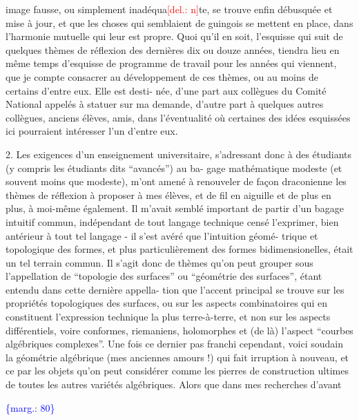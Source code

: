 \documentclass[11pt]{article}
\newcommand{\scanpage}[1]{\par\bigskip\noindent{\small\sffamily[scan #1]}\par}
\newcommand{\mspage}[1]{{\small\sffamily[p.\,#1]}}
\newcommand{\margin}[1]{\textcolor{blue}{\{\textsf{marg.:} #1\}}}
\newcommand{\deleted}[1]{\textcolor{red}{[\textsf{del.:} #1]}}
\begin{document}
image fausse, ou simplement inadéqua\deleted{n}te, se trouve enfin débusquée
et mise à jour, et que les choses qui semblaient de guingois se
mettent en place, dans l'harmonie mutuelle qui leur est propre.
\qquad Quoi qu'il en soit, l'esquisse qui suit de quelques
thèmes de réflexion des dernières dix ou douze années, tiendra
lieu en même temps d'esquisse de programme de travail pour les
années qui viennent, que je compte consacrer au développement de
ces thèmes, ou au moins de certains d'entre eux. Elle est desti-%
née, d'une part aux collègues du Comité National appelés à statuer
sur ma demande, d'autre part à quelques autres collègues, anciens
élèves, amis, dans l'éventualité où certaines des idées esquissées
ici pourraient intéresser l'un d'entre eux.

2. \qquad Les exigences d'un enseignement universitaire, s'adressant
donc à des étudiants (y compris les étudiants dits ``avancés'') au ba-%
gage mathématique modeste (et souvent moins que modeste), m'ont amené
à renouveler de façon draconienne les thèmes de réflexion à proposer
à mes élèves, et de fil en aiguille et de plus en plus, à moi-même
également. Il m'avait semblé important de partir d'un bagage intuitif
commun, indépendant de tout langage technique censé l'exprimer, bien
antérieur à tout tel langage - il s'est avéré que l'intuition géomé-%
trique et topologique des formes, et plus particulièrement des formes
bidimensionelles, était un tel terrain commun. Il s'agit donc de thèmes
qu'on peut grouper sous l'appellation de ``topologie des surfaces'' ou
``géométrie des surfaces'', étant entendu dans cette dernière appella-%
tion que l'accent principal se trouve sur les propriétés topologiques
des surfaces, ou sur les aspects combinatoires qui en constituent
l'expression technique la plus terre-à-terre, et non sur les aspects
différentiels, voire conformes, riemaniens, holomorphes et (de là)
l'aspect ``courbes algébriques complexes''. Une fois ce dernier pas
franchi cependant, voici soudain la géométrie algébrique (mes anciennes
amours !) qui fait irruption à nouveau, et ce par les objets qu'on
peut considérer comme les pierres de construction ultimes de toutes
les autres variétés algébriques. Alors que dans mes recherches d'avant

\margin{80}

\clearpage
\scanpage{119/81}
\mspage{3}
\end{document}
